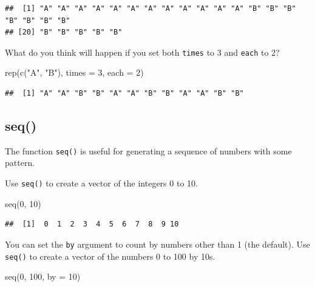 \documentclass[
  oneside]{book}
\newenvironment{Shaded}{\begin{snugshade}}{\end{snugshade}}
\newcommand{\AttributeTok}[1]{\textcolor[rgb]{0.77,0.63,0.00}{#1}}
\newcommand{\DecValTok}[1]{\textcolor[rgb]{0.00,0.00,0.81}{#1}}
\newcommand{\FunctionTok}[1]{\textcolor[rgb]{0.00,0.00,0.00}{#1}}
\newcommand{\NormalTok}[1]{#1}
\newcommand{\StringTok}[1]{\textcolor[rgb]{0.31,0.60,0.02}{#1}}
\begin{document}
\begin{verbatim}
##  [1] "A" "A" "A" "A" "A" "A" "A" "A" "A" "A" "A" "A" "B" "B" "B" "B" "B" "B" "B"
## [20] "B" "B" "B" "B" "B"
\end{verbatim}

What do you think will happen if you set both \texttt{times} to 3 and \texttt{each} to 2?

\begin{Shaded}
\begin{Highlighting}[]
\FunctionTok{rep}\NormalTok{(}\FunctionTok{c}\NormalTok{(}\StringTok{"A"}\NormalTok{, }\StringTok{"B"}\NormalTok{), }\AttributeTok{times =} \DecValTok{3}\NormalTok{, }\AttributeTok{each =} \DecValTok{2}\NormalTok{)}
\end{Highlighting}
\end{Shaded}

\begin{verbatim}
##  [1] "A" "A" "B" "B" "A" "A" "B" "B" "A" "A" "B" "B"
\end{verbatim}

\hypertarget{seq}{%
\subsection{seq()}\label{seq}}

The function \texttt{seq()} is useful for generating a sequence of numbers with some pattern.

Use \texttt{seq()} to create a vector of the integers 0 to 10.

\begin{Shaded}
\begin{Highlighting}[]
\FunctionTok{seq}\NormalTok{(}\DecValTok{0}\NormalTok{, }\DecValTok{10}\NormalTok{)}
\end{Highlighting}
\end{Shaded}

\begin{verbatim}
##  [1]  0  1  2  3  4  5  6  7  8  9 10
\end{verbatim}

You can set the \texttt{by} argument to count by numbers other than 1 (the default). Use \texttt{seq()} to create a vector of the numbers 0 to 100 by 10s.

\begin{Shaded}
\begin{Highlighting}[]
\FunctionTok{seq}\NormalTok{(}\DecValTok{0}\NormalTok{, }\DecValTok{100}\NormalTok{, }\AttributeTok{by =} \DecValTok{10}\NormalTok{)}
\end{Highlighting}
\end{Shaded}
\end{document}
